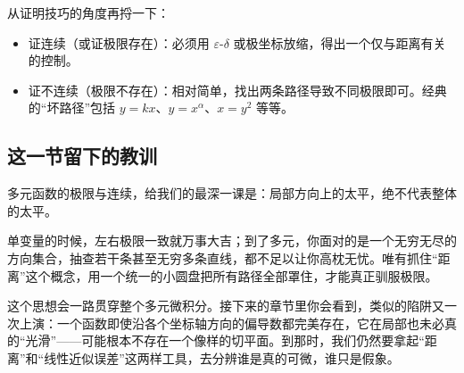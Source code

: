 从证明技巧的角度再捋一下：
\begin{itemize}
    \item 证连续（或证极限存在）：必须用 \(\varepsilon\)-\(\delta\) 或极坐标放缩，得出一个仅与距离有关的控制。
    \item 证不连续（极限不存在）：相对简单，找出两条路径导致不同极限即可。经典的``坏路径''包括 \(y=kx\)、\(y=x^\alpha\)、\(x=y^2\) 等等。
\end{itemize}

\subsection{这一节留下的教训}

多元函数的极限与连续，给我们的最深一课是：局部方向上的太平，绝不代表整体的太平。

单变量的时候，左右极限一致就万事大吉；到了多元，你面对的是一个无穷无尽的方向集合，抽查若干条甚至无穷多条直线，都不足以让你高枕无忧。唯有抓住``距离''这个概念，用一个统一的小圆盘把所有路径全部罩住，才能真正驯服极限。

这个思想会一路贯穿整个多元微积分。接下来的章节里你会看到，类似的陷阱又一次上演：一个函数即使沿各个坐标轴方向的偏导数都完美存在，它在局部也未必真的``光滑''——可能根本不存在一个像样的切平面。到那时，我们仍然要拿起``距离''和``线性近似误差''这两样工具，去分辨谁是真的可微，谁只是假象。